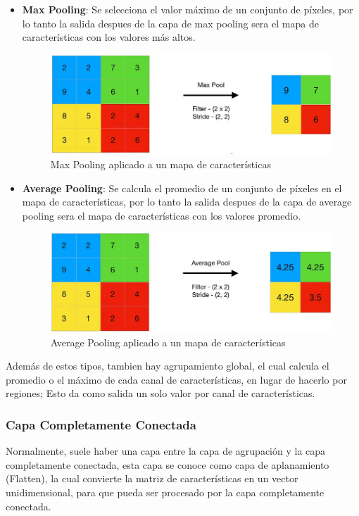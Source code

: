 \begin{itemize}
    \item \textbf{Max Pooling}:
    Se selecciona el valor máximo de un conjunto de píxeles, por lo tanto
    la salida despues de la capa de max pooling sera el mapa de características
    con los valores más altos.

    \begin{figure}[htbp]
        \centering
        \includegraphics[width=0.8\linewidth]{src/figures/max_pooling.png}
        \caption{Max Pooling aplicado a un mapa de características \cite{max_pooling}}
        \label{fig:max_pooling}
    \end{figure}

    \item \textbf{Average Pooling}:
    Se calcula el promedio de un conjunto de píxeles en el mapa de características,
    por lo tanto la salida despues de la capa de average pooling sera el mapa de
    características con los valores promedio.

    \begin{figure}[htbp]
        \centering
        \includegraphics[width=0.8\linewidth]{src/figures/average_pooling.png}
        \caption{Average Pooling aplicado a un mapa de características \cite{average_pooling}}
        \label{fig:average_pooling}
    \end{figure}
\end{itemize}

Además de estos tipos, tambien hay agrupamiento global, el cual calcula
el promedio o el máximo de cada canal de características, en lugar de
hacerlo por regiones; Esto da como salida un solo valor por canal de
características.

\subsubsection{Capa Completamente Conectada}
Normalmente, suele haber una capa entre la capa de agrupación y la capa
completamente conectada, esta capa se conoce como capa de aplanamiento
(Flatten), la cual convierte la matriz de características en un vector
unidimensional, para que pueda ser procesado por la capa completamente
conectada.

